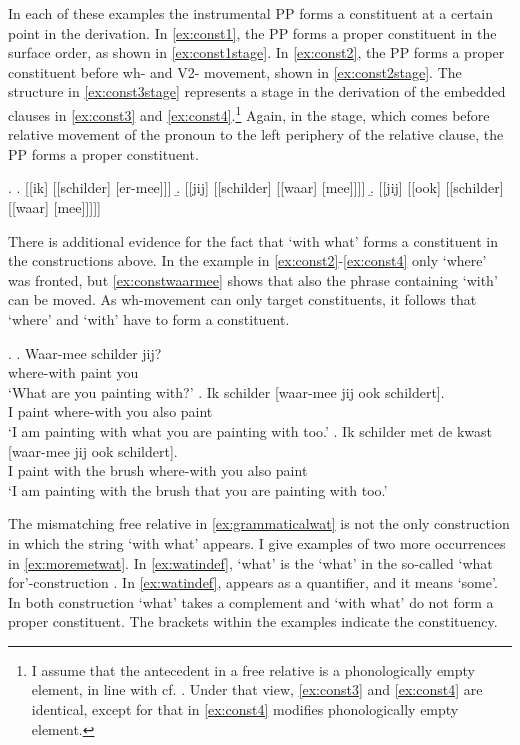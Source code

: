 \documentclass[12pt]{article}
\begin{document}
In each of these examples the instrumental PP forms a constituent at a certain point in the derivation. In \ref{ex:const1}, the PP forms a proper constituent in the surface order, as shown in \ref{ex:const1stage}. In \ref{ex:const2}, the PP forms a proper constituent before wh- and V2- movement, shown in \ref{ex:const2stage}.
The structure in \ref{ex:const3stage} represents a stage in the derivation of the embedded clauses in \ref{ex:const3} and \ref{ex:const4}.\footnote{I assume that the antecedent in a free relative is a phonologically empty element, in line with cf. \cite{bresnan1978a,groos1981,himmelreich2017}. Under that view, \ref{ex:const3} and \ref{ex:const4} are identical, except for that in \ref{ex:const4} modifies phonologically empty element.}
Again, in the stage, which comes before relative movement of the pronoun to the left periphery of the relative clause, the PP forms a proper constituent.

\ex.
\a. [[ik] [[schilder] [er-mee]]]\label{ex:const1stage}
\b. [[jij] [[schilder] [[waar] [mee]]]]\label{ex:const2stage}
\b. [[jij] [[ook] [[schilder] [[waar] [mee]]]]]\label{ex:const3stage}

There is additional evidence for the fact that  `with what' forms a constituent in the constructions above. In the example in \ref{ex:const2}-\ref{ex:const4} only  `where' was fronted, but \ref{ex:constwaarmee} shows that also the phrase containing  `with' can be moved. As wh-movement can only target constituents, it follows that  `where' and  `with' have to form a constituent.

\ex.\label{ex:constwaarmee}
\ag. Waar-mee schilder jij?\\
 {where-with} paint you\\
 `What are you painting with?'
\bg. Ik schilder [waar-mee jij ook schildert].\\
 I paint {where-with} you also paint\\
 `I am painting with what you are painting with too.'
\bg. Ik schilder met de kwast [waar-mee jij ook schildert].\\
 I paint with the brush {where-with} you also paint\\
 `I am painting with the brush that you are painting with too.'

The mismatching free relative in \ref{ex:grammaticalwat} is not the only construction in which the string  `with what' appears. I give examples of two more occurrences in \ref{ex:moremetwat}. In \ref{ex:watindef},  `what' is the  `what' in the so-called  `what for'-construction \citep[cf.][]{corver1991}.
In \ref{ex:watindef},  appears as a quantifier, and it means `some'. In both construction  `what' takes a complement and  `with what' do not form a proper constituent. The brackets within the examples indicate the constituency.
\end{document}
